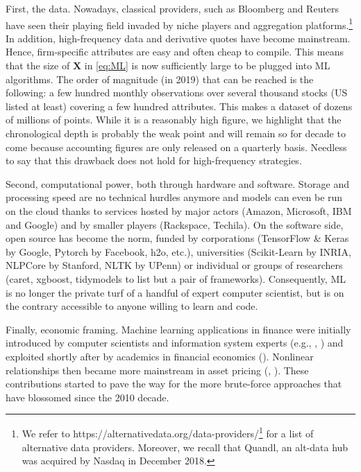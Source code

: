 \documentclass[]{krantz}
\renewcommand{\href}[2]{#2\footnote{\url{#1}}}
\let\rmarkdownfootnote\footnote%
\def\footnote{\protect\rmarkdownfootnote}
\theoremstyle{definition}
\theoremstyle{definition}
\theoremstyle{definition}
\theoremstyle{remark}
\begin{document}
First, the data. Nowadays, classical providers, such as Bloomberg and
Reuters have seen their playing field invaded by niche players and
aggregation platforms.\footnote{We refer to
  \href{https://alternativedata.org/data-providers/}{https://alternativedata.org/data-providers/}
  for a list of alternative data providers. Moreover, we recall that
  Quandl, an alt-data hub was acquired by Nasdaq in December 2018.} In
addition, high-frequency data and derivative quotes have become
mainstream. Hence, firm-specific attributes are easy and often cheap to
compile. This means that the size of \(\mathbf{X}\) in \eqref{eq:ML} is
now sufficiently large to be plugged into ML algorithms. The order of
magnitude (in 2019) that can be reached is the following: a few hundred
monthly observations over several thousand stocks (US listed at least)
covering a few hundred attributes. This makes a dataset of dozens of
millions of points. While it is a reasonably high figure, we highlight
that the chronological depth is probably the weak point and will remain
so for decade to come because accounting figures are only released on a
quarterly basis. Needless to say that this drawback does not hold for
high-frequency strategies.

Second, computational power, both through hardware and software. Storage
and processing speed are no technical hurdles anymore and models can
even be run on the cloud thanks to services hosted by major actors
(Amazon, Microsoft, IBM and Google) and by smaller players (Rackspace,
Techila). On the software side, open source has become the norm, funded
by corporations (TensorFlow \& Keras by Google, Pytorch by Facebook,
h2o, etc.), universities (Scikit-Learn by INRIA, NLPCore by Stanford,
NLTK by UPenn) or individual or groups of researchers (caret, xgboost,
tidymodels to list but a pair of frameworks). Consequently, ML is no
longer the private turf of a handful of expert computer scientist, but
is on the contrary accessible to anyone willing to learn and code.

Finally, economic framing. Machine learning applications in finance were
initially introduced by computer scientists and information system
experts (e.g., \citet{braun1987predicting}, \citet{white1988economic})
and exploited shortly after by academics in financial economics
(\citet{bansal1993no}). Nonlinear relationships then became more
mainstream in asset pricing (\citet{freeman1992nonlinear},
\citet{bansal1993new}). These contributions started to pave the way for
the more brute-force approaches that have blossomed since the 2010
decade.
\end{document}
